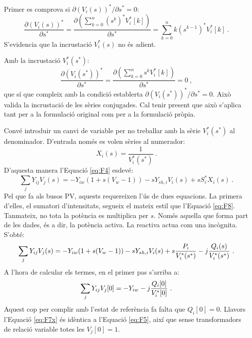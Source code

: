 Primer es comprova si $\partial (V_i(s))^* / \partial s^* = 0$:
\begin{equation}
    \frac{\partial (V_i(s))^*}{\partial s^*}=\frac{\partial (\sum_{k=0}^n (s^k)^*V^*_i[k])}{\partial s^*}=\sum_{k=0}^n k(s^{k-1})^*V^*_i[k]\ .
    \label{eq:CR1}
\end{equation}
S'evidencia que la incrustació $V^*_i(s)$ no és adient. 

Amb la incrustació $V^*_i(s^*)$:
\begin{equation}
    \frac{\partial (V_i(s^*))^*}{\partial s^*}=\frac{\partial (\sum_{k=0}^n s^kV^*_i[k])}{\partial s^*}=0\ ,
    \label{eq:CR2}
\end{equation}
que sí que compleix amb la condició establerta $\partial (V_i(s^*))^* / \partial s^* = 0$. Això valida la incrustació de les sèries conjugades. Cal tenir present que això s'aplica tant per a la formulació original com per a la formulació pròpia. 

Convé introduir un canvi de variable per no treballar amb la sèrie $V^*_i(s^*)$ al denominador. D'entrada només es volen sèries al numerador:
\begin{equation}
    X_i(s)=\frac{1}{V^*_i(s^*)}\ .
    \label{eq:F7}
\end{equation}
D'aquesta manera l'Equació \ref{eq:F4} esdevé:
\begin{equation}
    \sum_{j}Y_{ij}V_j(s) = -Y_{iw}(1+s(V_w-1)) -sY_{sh,i}V_i(s)+sS^*_iX_i(s)\ .
        \label{eq:F8}
\end{equation}
Pel que fa als busos PV, aquests requereixen l'ús de dues equacions. La primera d'elles, el sumatori d'intensitats, segueix el mateix estil que l'Equació \ref{eq:F8}. Tanmateix, no tota la potència es multiplica per $s$. Només aquella que forma part de les dades, és a dir, la potència activa. La reactiva actua com una incògnita. S'obté:
\begin{equation}
    \sum_{j}Y_{ij}V_j(s) = -Y_{iw}(1+s(V_w-1)) -sY_{sh,i}V_i(s)+s\frac{P_i}{V^*_i(s^*)}-j\frac{Q_i(s)}{V^*_i(s^*)}\ .
        \label{eq:F6x}
\end{equation}
A l'hora de calcular els termes, en el primer pas s'arriba a:
\begin{equation}
    \sum_{j}Y_{ij}V_j[0] = -Y_{iw}-j\frac{Q_i[0]}{V^*_i[0]}\ .
        \label{eq:F7x}
\end{equation}
Aquest cop per complir amb l'estat de referència fa falta que $Q_i[0]=0$. Llavors l'Equació \ref{eq:F7x} és idèntica a l'Equació \ref{eq:F5}, així que sense transformadors de relació variable totes les $V_j[0]=1$. 

